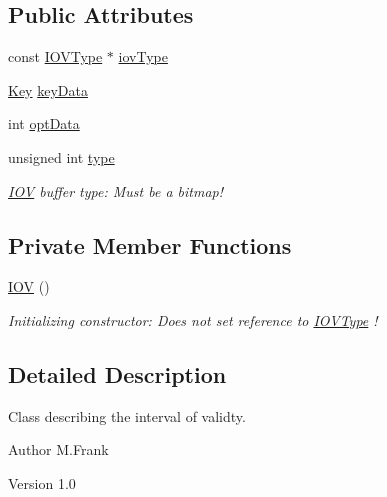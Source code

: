 \subsection*{Public Attributes}
\begin{DoxyCompactItemize}
\item 
const \hyperlink{class_d_d4hep_1_1_i_o_v_type}{IOVType} $\ast$ \hyperlink{class_d_d4hep_1_1_i_o_v_a885a5ed2be528cf1db783cade2a0b838}{iovType}
\item 
\hyperlink{class_d_d4hep_1_1_i_o_v_a07cb46dc875296dc9cccf4ff370104ae}{Key} \hyperlink{class_d_d4hep_1_1_i_o_v_a28eb02fd8d9c45b770e6a234303991de}{keyData}
\item 
int \hyperlink{class_d_d4hep_1_1_i_o_v_a0bd227cbdf7eab4949e12bffc7238d72}{optData}
\item 
unsigned int \hyperlink{class_d_d4hep_1_1_i_o_v_a497f2859ca7cb011151ae6b977b50aa0}{type}
\begin{DoxyCompactList}\small\item\em \hyperlink{class_d_d4hep_1_1_i_o_v}{IOV} buffer type: Must be a bitmap! \item\end{DoxyCompactList}\end{DoxyCompactItemize}
\subsection*{Private Member Functions}
\begin{DoxyCompactItemize}
\item 
\hyperlink{class_d_d4hep_1_1_i_o_v_a1ba2ab174011fccf1dba8cd60e1d6bd1}{IOV} ()
\begin{DoxyCompactList}\small\item\em Initializing constructor: Does not set reference to \hyperlink{class_d_d4hep_1_1_i_o_v_type}{IOVType} ! \item\end{DoxyCompactList}\end{DoxyCompactItemize}


\subsection{Detailed Description}
Class describing the interval of validty. \begin{DoxyAuthor}{Author}
M.Frank 
\end{DoxyAuthor}
\begin{DoxyVersion}{Version}
1.0 
\end{DoxyVersion}


